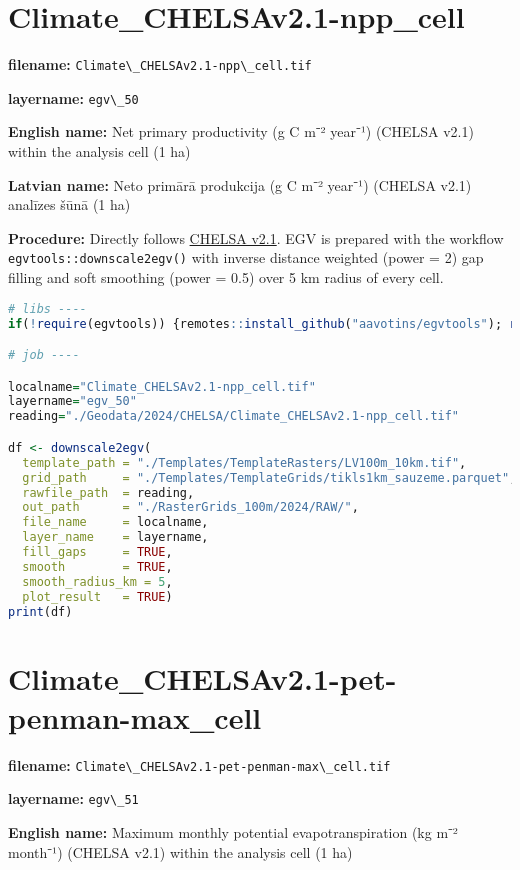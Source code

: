 \documentclass[
]{book}
\newcommand{\passthrough}[1]{#1}
\begin{document}
\section{Climate\_CHELSAv2.1-npp\_cell}\label{ch06.050}

\textbf{filename:} \passthrough{\lstinline!Climate\_CHELSAv2.1-npp\_cell.tif!}

\textbf{layername:} \passthrough{\lstinline!egv\_50!}

\textbf{English name:} Net primary productivity (g C m⁻² year⁻¹) (CHELSA v2.1) within the analysis cell (1 ha)

\textbf{Latvian name:} Neto primārā produkcija (g C m⁻² year⁻¹) (CHELSA v2.1) analīzes šūnā (1 ha)

\textbf{Procedure:} Directly follows \hyperref[Ch04.11]{CHELSA v2.1}. EGV is prepared with the
workflow \passthrough{\lstinline!egvtools::downscale2egv()!} with inverse distance weighted (power = 2)
gap filling and soft smoothing (power = 0.5) over 5 km radius of every cell.

\begin{lstlisting}[language=R]
# libs ----
if(!require(egvtools)) {remotes::install_github("aavotins/egvtools"); require(egvtools)}

# job ----

localname="Climate_CHELSAv2.1-npp_cell.tif"
layername="egv_50"
reading="./Geodata/2024/CHELSA/Climate_CHELSAv2.1-npp_cell.tif"

df <- downscale2egv(
  template_path = "./Templates/TemplateRasters/LV100m_10km.tif",
  grid_path     = "./Templates/TemplateGrids/tikls1km_sauzeme.parquet",
  rawfile_path  = reading,
  out_path      = "./RasterGrids_100m/2024/RAW/",
  file_name     = localname,
  layer_name    = layername,
  fill_gaps     = TRUE,
  smooth        = TRUE,
  smooth_radius_km = 5,
  plot_result   = TRUE)
print(df)
\end{lstlisting}

\section{Climate\_CHELSAv2.1-pet-penman-max\_cell}\label{ch06.051}

\textbf{filename:} \passthrough{\lstinline!Climate\_CHELSAv2.1-pet-penman-max\_cell.tif!}

\textbf{layername:} \passthrough{\lstinline!egv\_51!}

\textbf{English name:} Maximum monthly potential evapotranspiration (kg m⁻² month⁻¹) (CHELSA v2.1) within the analysis cell (1 ha)
\end{document}
